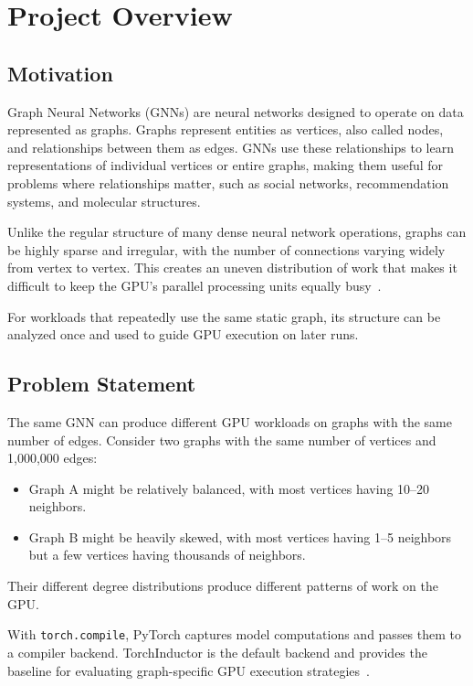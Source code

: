\section{Project Overview}
\label{sec:project-overview}

\subsection{Motivation}
\label{sec:motivation}

Graph Neural Networks (GNNs) are neural networks designed to operate on data represented as graphs. Graphs represent entities as vertices, also called nodes, and relationships between them as edges. GNNs use these relationships to learn representations of individual vertices or entire graphs, making them useful for problems where relationships matter, such as social networks, recommendation systems, and molecular structures.

Unlike the regular structure of many dense neural network operations, graphs can be highly sparse and irregular, with the number of connections varying widely from vertex to vertex. This creates an uneven distribution of work that makes it difficult to keep the GPU's parallel processing units equally busy~\cite{gnnAdvisor}.

For workloads that repeatedly use the same static graph, its structure can be analyzed once and used to guide GPU execution on later runs.

\subsection{Problem Statement}
\label{sec:problem-statement}

The same GNN can produce different GPU workloads on graphs with the same number of edges. Consider two graphs with the same number of vertices and 1,000,000 edges:

\begin{itemize}
  \item Graph A might be relatively balanced, with most vertices having 10--20 neighbors.
  \item Graph B might be heavily skewed, with most vertices having 1--5 neighbors but a few vertices having thousands of neighbors.
\end{itemize}

Their different degree distributions produce different patterns of work on the GPU.

With \texttt{torch.compile}, PyTorch captures model computations and passes them to a compiler backend. TorchInductor is the default backend and provides the baseline for evaluating graph-specific GPU execution strategies~\cite{pytorchCompilerDocs}.

